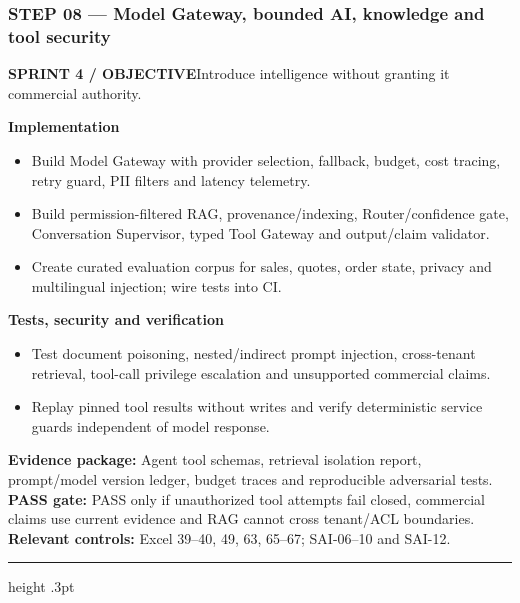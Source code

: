 \documentclass[10.5pt,a4paper,oneside]{article}
\newcommand{\eyebrow}[1]{{\sffamily\footnotesize\bfseries\color{gold}\MakeUppercase{#1}}}
\begin{document}
\subsubsection*{STEP 08 --- Model Gateway, bounded AI, knowledge and tool security}
\eyebrow{Sprint 4 / objective}\quad Introduce intelligence without granting it commercial authority.
\begin{tcolorbox}[colback=warm,colframe=line,boxrule=.45pt,arc=2pt,left=8pt,right=8pt,top=6pt,bottom=6pt]\textbf{Implementation}
\begin{itemize}
\item Build Model Gateway with provider selection, fallback, budget, cost tracing, retry guard, PII filters and latency telemetry.
\item Build permission-filtered RAG, provenance/indexing, Router/confidence gate, Conversation Supervisor, typed Tool Gateway and output/claim validator.
\item Create curated evaluation corpus for sales, quotes, order state, privacy and multilingual injection; wire tests into CI.
\end{itemize}
\textbf{Tests, security and verification}
\begin{itemize}
\item Test document poisoning, nested/indirect prompt injection, cross-tenant retrieval, tool-call privilege escalation and unsupported commercial claims.
\item Replay pinned tool results without writes and verify deterministic service guards independent of model response.
\end{itemize}
\textbf{Evidence package:} Agent tool schemas, retrieval isolation report, prompt/model version ledger, budget traces and reproducible adversarial tests.\\
\textbf{PASS gate:} PASS only if unauthorized tool attempts fail closed, commercial claims use current evidence and RAG cannot cross tenant/ACL boundaries.\\
\textbf{Relevant controls:} Excel 39--40, 49, 63, 65--67; SAI-06--10 and SAI-12.
\end{tcolorbox}
\medskip\hrule height .3pt\medskip\Needspace{100mm}
\end{document}
